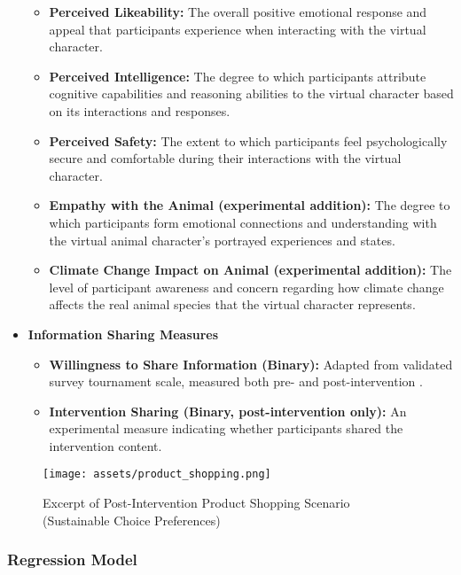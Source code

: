\documentclass[sigconf, nonacm]{acmart}
\begin{document}
\begin{itemize}
\begin{itemize}
    \item \textbf{Perceived Likeability:} The overall positive emotional response and appeal that participants experience when interacting with the virtual character.
    
    \item \textbf{Perceived Intelligence:} The degree to which participants attribute cognitive capabilities and reasoning abilities to the virtual character based on its interactions and responses.
    
    \item \textbf{Perceived Safety:} The extent to which participants feel psychologically secure and comfortable during their interactions with the virtual character.
    
    \item \textbf{Empathy with the Animal (experimental addition):} The degree to which participants form emotional connections and understanding with the virtual animal character's portrayed experiences and states.
    
    \item \textbf{Climate Change Impact on Animal (experimental addition):} The level of participant awareness and concern regarding how climate change affects the real animal species that the virtual character represents.
    \end{itemize}

    \item \textbf{Information Sharing Measures}
    \begin{itemize}
        \item \textbf{Willingness to Share Information (Binary):} Adapted from validated survey tournament scale, measured both pre- and post-intervention \cite{Vlasceanu2024}.
        \item \textbf{Intervention Sharing (Binary, post-intervention only):} An experimental measure indicating whether participants shared the intervention content.
    \end{itemize}
\end{itemize}

\begin{figure}[h]
    \centering
    \texttt{[image: assets/product\_shopping.png]}
    \caption{Excerpt of Post-Intervention Product Shopping Scenario (Sustainable Choice Preferences)}
    \label{fig:shopping_scenario}
\end{figure}

\subsubsection{Regression Model}
\end{document}
